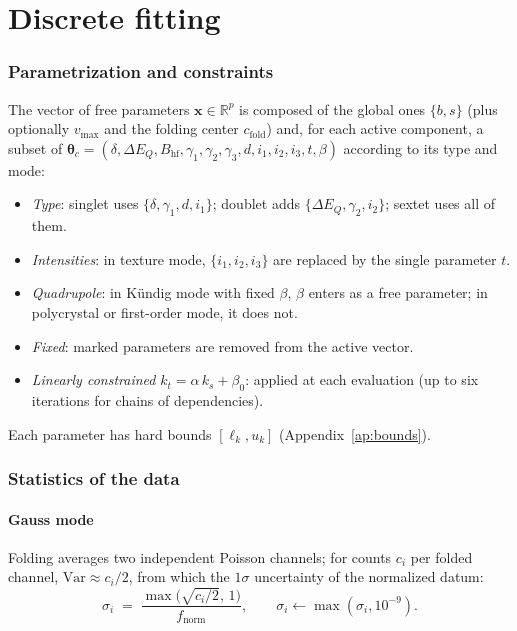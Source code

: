 \documentclass[11pt,a4paper]{article}
\newcommand{\BHF}{B_{\mathrm{hf}}}
\newcommand{\dEQ}{\Delta E_{Q}}
\begin{document}
\part{Discrete fitting}

\section{Parametrization and constraints}\label{sec:disc-param}

The vector of free parameters $\bm x\in\mathbb R^{p}$ is composed of the global ones
$\{b,s\}$ (plus optionally $v_{\max}$ and the folding center $c_{\text{fold}}$) and,
for each active component, a subset of
$\bm\theta_c=(\delta,\dEQ,\BHF,\gamma_1,\gamma_2,\gamma_3,d,i_1,i_2,i_3,t,\beta)$
according to its type and mode:
\begin{itemize}[leftmargin=*]
  \item \emph{Type}: singlet uses $\{\delta,\gamma_1,d,i_1\}$; doublet adds
        $\{\dEQ,\gamma_2,i_2\}$; sextet uses all of them.
  \item \emph{Intensities}: in texture mode, $\{i_1,i_2,i_3\}$ are replaced by
        the single parameter $t$.
  \item \emph{Quadrupole}: in Kündig mode with fixed $\beta$, $\beta$ enters as a
        free parameter; in polycrystal or first-order mode, it does not.
  \item \emph{Fixed}: marked parameters are removed from the active vector.
  \item \emph{Linearly constrained} $k_t=\alpha\,k_s+\beta_0$: applied at each
        evaluation (up to six iterations for chains of dependencies).
\end{itemize}
Each parameter has hard bounds $[\ell_k,u_k]$ (Appendix~\ref{ap:bounds}).

\section{Statistics of the data}\label{sec:weighting}

\subsection{Gauss mode}
Folding averages two independent Poisson channels; for counts $c_i$ per
folded channel, $\mathrm{Var}\approx c_i/2$, from which the $1\sigma$ uncertainty
of the normalized datum:
\begin{equation}
  \sigma_i \;=\; \frac{\max\!\bigl(\sqrt{c_i/2},\,1\bigr)}{f_{\text{norm}}},
  \qquad \sigma_i\leftarrow\max(\sigma_i,10^{-9}).
  \label{eq:sigma-gauss}
\end{equation}
\end{document}

